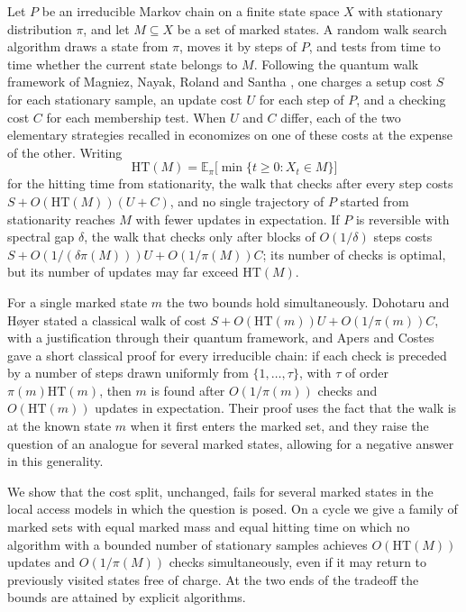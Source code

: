 \documentclass{amsart}
\theoremstyle{plain}
\theoremstyle{definition}
\theoremstyle{remark}
\newcommand{\E}{\mathbb{E}}
\newcommand{\HT}{\mathrm{HT}}
\begin{document}
Let $P$ be an irreducible Markov chain on a finite state space $X$ with stationary distribution $\pi$, and let $M\subseteq X$ be a set of marked states. A random walk search algorithm draws a state from $\pi$, moves it by steps of $P$, and tests from time to time whether the current state belongs to $M$. Following the quantum walk framework of Magniez, Nayak, Roland and Santha \cite{MNRS}, one charges a setup cost $S$ for each stationary sample, an update cost $U$ for each step of $P$, and a checking cost $C$ for each membership test. When $U$ and $C$ differ, each of the two elementary strategies recalled in \cite{AC} economizes on one of these costs at the expense of the other. Writing
\[
\HT(M)=\E_\pi\bigl[\min\{t\ge 0: X_t\in M\}\bigr]
\]
for the hitting time from stationarity, the walk that checks after every step costs $S+O(\HT(M))(U+C)$, and no single trajectory of $P$ started from stationarity reaches $M$ with fewer updates in expectation. If $P$ is reversible with spectral gap $\delta$, the walk that checks only after blocks of $O(1/\delta)$ steps costs $S+O(1/(\delta\pi(M)))U+O(1/\pi(M))C$; its number of checks is optimal, but its number of updates may far exceed $\HT(M)$.

For a single marked state $m$ the two bounds hold simultaneously. Dohotaru and H{\o}yer \cite[Section~6]{DH} stated a classical walk of cost $S+O(\HT(m))U+O(1/\pi(m))C$, with a justification through their quantum framework, and Apers and Costes \cite{AC} gave a short classical proof for every irreducible chain: if each check is preceded by a number of steps drawn uniformly from $\{1,\dots,\tau\}$, with $\tau$ of order $\pi(m)\HT(m)$, then $m$ is found after $O(1/\pi(m))$ checks and $O(\HT(m))$ updates in expectation. Their proof uses the fact that the walk is at the known state $m$ when it first enters the marked set, and they raise \cite[Sections~7 and~8]{AC} the question of an analogue for several marked states, allowing for a negative answer in this generality.

We show that the cost split, unchanged, fails for several marked states in the local access models in which the question is posed. On a cycle we give a family of marked sets with equal marked mass and equal hitting time on which no algorithm with a bounded number of stationary samples achieves $O(\HT(M))$ updates and $O(1/\pi(M))$ checks simultaneously, even if it may return to previously visited states free of charge. At the two ends of the tradeoff the bounds are attained by explicit algorithms.
\end{document}
